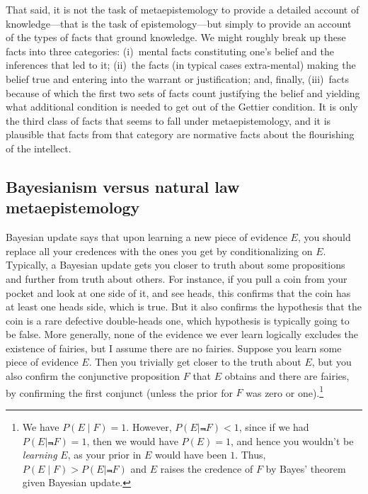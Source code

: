 That said, it is not the task of metaepistemology to provide a detailed account of knowledge---that is the task of epistemology---but simply
to provide an account of the types of facts that ground knowledge. We might roughly break up these facts into three categories:
(i)~mental facts constituting one's belief and the inferences that led to it; (ii)~the facts (in typical cases extra-mental) making the 
belief true and entering into the warrant or justification; and, finally, (iii)~facts because of which the first two sets of
facts count justifying the belief and yielding what additional condition is needed to get out of the Gettier condition. It is only
the third class of facts that seems to fall under metaepistemology, and it is plausible that facts from that category are normative 
facts about the flourishing of the intellect. 

\subsection{Bayesianism versus natural law metaepistemology}
Bayesian update says that upon learning a new piece of evidence $E$, you should replace all your credences with the 
ones you get by conditionalizing on $E$. Typically, a Bayesian update gets you closer to truth about some 
propositions and further from truth about others. For instance, if you pull a coin from your pocket and look at one
side of it, and see heads, this confirms that the coin has at least one heads side, which is true. But it also 
confirms the hypothesis that the coin is a rare defective double-heads one, which hypothesis is typically going to 
be false. More generally, none of the evidence we ever learn logically excludes the existence of fairies, but I 
assume there are no fairies. Suppose you learn some piece of evidence $E$. Then you trivially get closer to the truth
about $E$, but you also confirm the conjunctive proposition $F$ that $E$ obtains and there are fairies, by confirming the 
first conjunct (unless the prior for $F$ was zero or one).\footnote{We have $P(E\mid F)=1$. However, $P(E\mid \Not F)<1$,
since if we had $P(E\mid \Not F)=1$, then we would have $P(E)=1$, and hence you wouldn't be \textit{learning} $E$, as your
prior in $E$ would have been $1$. Thus, $P(E\mid F)>P(E\mid\Not F)$ and $E$ raises the credence of $F$ by Bayes' theorem
given Bayesian update.} 


